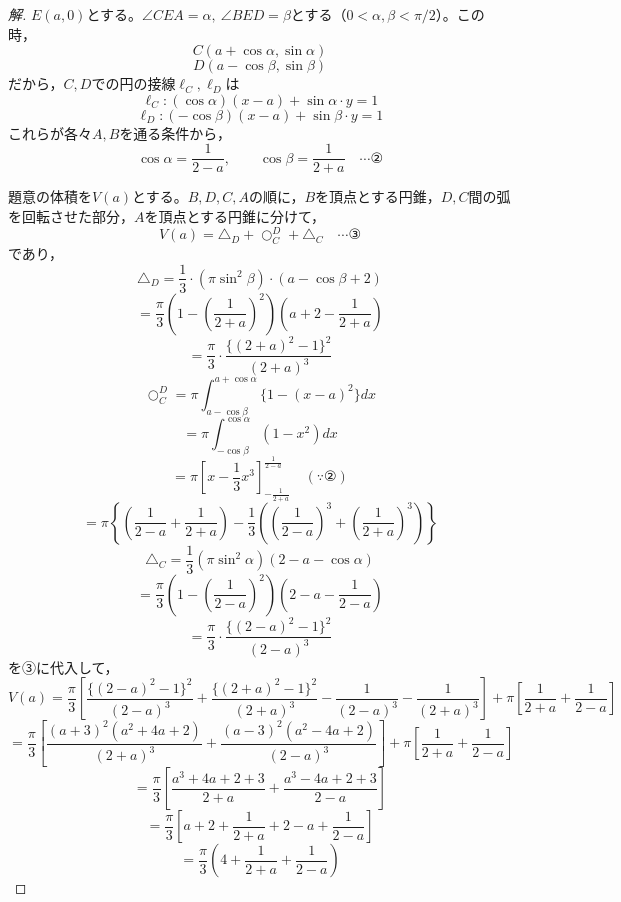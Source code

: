 \documentclass[../main.tex]{subfiles}
\begin{document}
\begin{proof}[解]
  $E(a,0)$とする。$\angle CEA=\alpha,\ \angle BED=\beta$とする（$0<\alpha,\beta<\pi/2$）。この時，
  \[
    C(a+\cos\alpha,\sin\alpha)
  \]
  \[
    D(a-\cos\beta,\sin\beta)
  \]
  だから，$C,D$での円の接線$\ell_C,\ell_D$は
  \[
    \ell_C: (\cos\alpha)(x-a)+\sin\alpha\cdot y=1
  \]
  \[
    \ell_D: (-\cos\beta)(x-a)+\sin\beta\cdot y=1
  \]
  これらが各々$A,B$を通る条件から，
  \[
    \cos\alpha=\frac{1}{2-a}, \qquad \cos\beta=\frac{1}{2+a} \quad\cdots\text{②}
  \]

  \begin{center}
  \end{center}

  題意の体積を$V(a)$とする。$B,D,C,A$の順に，$B$を頂点とする円錐，$D,C$間の弧を回転させた部分，$A$を頂点とする円錐に分けて，
  \[
    V(a)=\triangle_D+\bigcirc_C^D+\triangle_C \quad\cdots\text{③}
  \]
  であり，
  \[
    \triangle_D=\frac13\cdot(\pi\sin^2\beta)\cdot(a-\cos\beta+2)
  \]
  \[
    =\frac{\pi}{3}\left(1-\left(\frac{1}{2+a}\right)^2\right)\left(a+2-\frac{1}{2+a}\right)
  \]
  \[
    =\frac{\pi}{3}\cdot\frac{\{(2+a)^2-1\}^2}{(2+a)^3}
  \]
  \[
    \bigcirc_C^D=\pi\int_{a-\cos\beta}^{a+\cos\alpha}\{1-(x-a)^2\}dx
  \]
  \[
    =\pi\int_{-\cos\beta}^{\cos\alpha}(1-x^2)dx
  \]
  \[
    =\pi\left[x-\frac13x^3\right]_{-\frac{1}{2+a}}^{\frac{1}{2-a}} \quad(\because②)
  \]
  \[
    =\pi\left\{\left(\frac{1}{2-a}+\frac{1}{2+a}\right)-\frac13\left(\left(\frac{1}{2-a}\right)^3+\left(\frac{1}{2+a}\right)^3\right)\right\}
  \]
  \[
    \triangle_C=\frac13(\pi\sin^2\alpha)(2-a-\cos\alpha)
  \]
  \[
    =\frac{\pi}{3}\left(1-\left(\frac{1}{2-a}\right)^2\right)\left(2-a-\frac{1}{2-a}\right)
  \]
  \[
    =\frac{\pi}{3}\cdot\frac{\{(2-a)^2-1\}^2}{(2-a)^3}
  \]
  を③に代入して，
  \[
    V(a)=\frac{\pi}{3}\left[\frac{\{(2-a)^2-1\}^2}{(2-a)^3}+\frac{\{(2+a)^2-1\}^2}{(2+a)^3}-\frac{1}{(2-a)^3}-\frac{1}{(2+a)^3}\right]+\pi\left[\frac{1}{2+a}+\frac{1}{2-a}\right]
  \]
  \[
    =\frac{\pi}{3}\left[\frac{(a+3)^2(a^2+4a+2)}{(2+a)^3}+\frac{(a-3)^2(a^2-4a+2)}{(2-a)^3}\right]+\pi\left[\frac{1}{2+a}+\frac{1}{2-a}\right]
  \]
  \[
    =\frac{\pi}{3}\left[\frac{a^3+4a+2+3}{2+a}+\frac{a^3-4a+2+3}{2-a}\right]
  \]
  \[
    =\frac{\pi}{3}\left[a+2+\frac{1}{2+a}+2-a+\frac{1}{2-a}\right]
  \]
  \[
    =\frac{\pi}{3}\left(4+\frac{1}{2+a}+\frac{1}{2-a}\right)
  \]
\end{proof}
\end{document}
